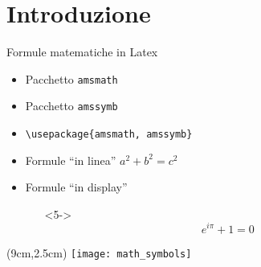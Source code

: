 \section{Introduzione}
  \begin{frame}{Formule matematiche in Latex}

    \begin{itemize}
      \item<1-> Pacchetto \texttt{amsmath}
      \item<2-> Pacchetto \texttt{amssymb}
	  \item<3-> \texttt{\textbackslash usepackage\{amsmath, amssymb\}}
    \end{itemize}

    \begin{itemize}
      \item<4-> Formule ``in linea'' $a^2 + b^2 = c^2$
      \item<5-> Formule ``in display''
      \begin{itemize}
        \item[]<5-> \begin{equation} e^{i\pi}+1=0 \end{equation}
      \end{itemize}
    \end{itemize}
    
    \begin{textblock*}{5cm}(9cm,2.5cm)
      \texttt{[image: math\_symbols]}
    \end{textblock*}

\end{frame}
